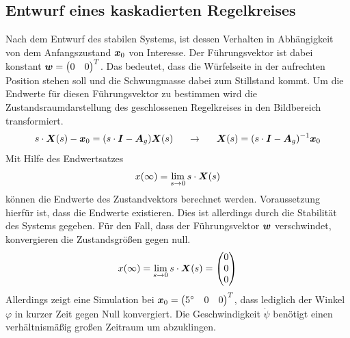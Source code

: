 \subsection{Entwurf eines kaskadierten Regelkreises}
Nach dem Entwurf des stabilen Systems, ist dessen Verhalten in Abhängigkeit von dem Anfangszustand $\boldsymbol{x}_0$ von Interesse. Der Führungsvektor ist dabei konstant $\boldsymbol{w}=\begin{pmatrix}
0 & 0 
\end{pmatrix}^T$. Das bedeutet, dass die Würfelseite in der aufrechten Position stehen soll und die Schwungmasse dabei zum Stillstand kommt. Um die Endwerte für diesen Führungsvektor zu bestimmen wird die Zustandsraumdarstellung des geschlossenen Regelkreises in den Bildbereich transformiert.
\begin{equation}
s\cdot\boldsymbol{X}(s) - \boldsymbol{x}_0 = (s\cdot\boldsymbol{I}-\boldsymbol{A}_g)\boldsymbol{X}(s) \hspace{15pt}\rightarrow\hspace{15pt} \boldsymbol{X}(s) = (s\cdot\boldsymbol{I}-\boldsymbol{A}_g)^{-1}\boldsymbol{x}_0
\end{equation}
Mit Hilfe des Endwertsatzes
\begin{equation}
x(\infty)=\lim_{s\rightarrow 0} s\cdot \boldsymbol{X}(s)
\end{equation}
können die Endwerte des Zustandvektors berechnet werden. Voraussetzung hierfür ist, dass die Endwerte existieren. Dies ist allerdings durch die Stabilität des Systems gegeben. Für den Fall, dass der Führungsvektor $\boldsymbol{w}$ verschwindet, konvergieren die Zustandsgrößen gegen null.
\begin{equation}
x(\infty)=\lim_{s\rightarrow 0} s\cdot \boldsymbol{X}(s) = \begin{pmatrix}
0 \\ 0 \\ 0
\end{pmatrix}
\end{equation}
Allerdings zeigt eine Simulation bei $\boldsymbol{x}_0=\begin{pmatrix}
5^\circ & 0 & 0
\end{pmatrix}^T$, dass lediglich der Winkel $\varphi$ in kurzer Zeit gegen Null konvergiert. Die Geschwindigkeit $\dot{\psi}$ benötigt einen verhältnismäßig großen Zeitraum um abzuklingen.
